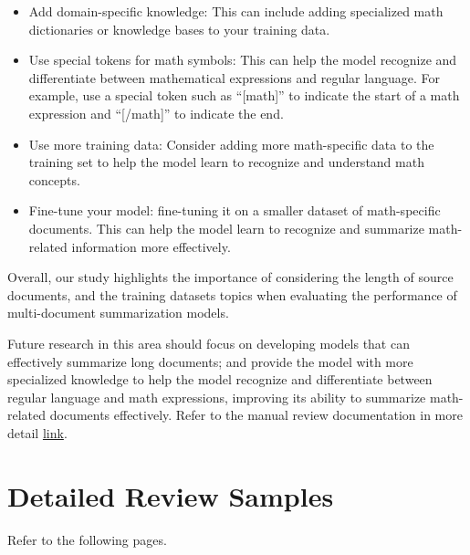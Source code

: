 \documentclass[12pt, twocolumn]{article}
\numberwithin{equation}{section}
\begin{document}
\begin{itemize}
    \item Add domain-specific knowledge: This can include adding specialized math dictionaries or knowledge bases to your training data. 
    \item Use special tokens for math symbols: This can help the model recognize and differentiate between mathematical expressions and regular language. For example, use a special token such as ``[math]'' to indicate the start of a math expression and ``[/math]'' to indicate the end.
    \item Use more training data: Consider adding more math-specific data to the training set to help the model learn to recognize and understand math concepts.
    \item Fine-tune your model: fine-tuning it on a smaller dataset of math-specific documents. This can help the model learn to recognize and summarize math-related information more effectively.
\end{itemize}

Overall, our study highlights the importance of considering the length of source documents, and the training datasets topics when evaluating the performance of multi-document summarization models. 

Future research in this area should focus on developing models that can effectively summarize long documents; and provide the model with more specialized knowledge to help the model recognize and differentiate between regular language and math expressions, improving its ability to summarize math-related documents effectively. Refer to the manual review documentation in more detail \href{https://drive.google.com/file/d/1sPLj4a-rafh1EjOR7l_QMveexfoaxq3y/view?usp=share_link}{link}.

\section{Detailed Review Samples}
\label{app:samples}

Refer to the following pages.

{
    
    
}
\end{document}
